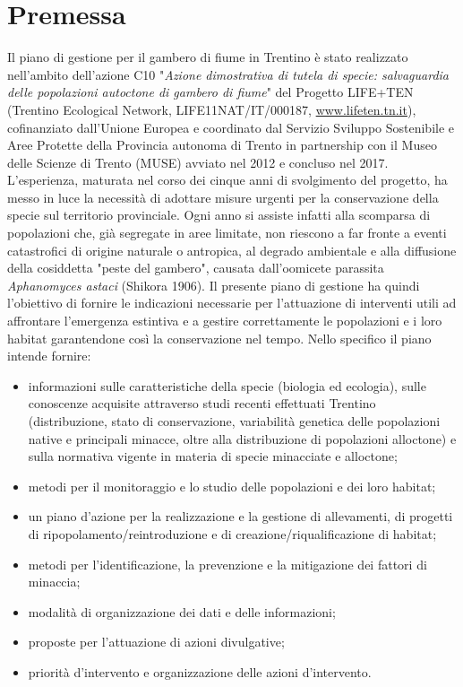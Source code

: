 \documentclass[11pt,a4paper,italian,twoside,openany]{memoir}
\begin{document}
\chapter{Premessa}
Il piano di gestione per il gambero di fiume in Trentino è stato realizzato nell'ambito dell'azione C10 "\emph{Azione dimostrativa di tutela di specie: salvaguardia delle popolazioni autoctone di gambero di fiume}" del Progetto LIFE+TEN (Trentino Ecological Network, LIFE11NAT/IT/000187, \url{www.lifeten.tn.it}), cofinanziato dall'Unione Europea e coordinato dal Servizio Sviluppo Sostenibile e Aree Protette della Provincia autonoma di Trento in partnership con il Museo delle Scienze di Trento (MUSE) avviato nel 2012 e concluso nel 2017. L'esperienza, maturata nel corso dei cinque anni di svolgimento del progetto, ha messo in luce la necessità di adottare misure urgenti per la conservazione della specie sul territorio provinciale. Ogni anno si assiste infatti alla scomparsa di popolazioni che, già segregate in aree limitate, non riescono a far fronte a eventi catastrofici di origine naturale o antropica, al degrado ambientale e alla diffusione della cosiddetta "peste del gambero", causata dall'oomicete parassita \emph{Aphanomyces astaci} (Shikora 1906). Il presente piano di gestione ha quindi l'obiettivo di fornire le indicazioni necessarie per l'attuazione di interventi utili ad affrontare l'emergenza estintiva e a gestire correttamente le popolazioni e i loro habitat garantendone così la conservazione nel tempo. 
Nello specifico il piano intende fornire:
\begin{itemize}

  \item informazioni sulle caratteristiche della specie (biologia ed ecologia), sulle conoscenze acquisite attraverso studi recenti effettuati Trentino (distribuzione, stato di conservazione, variabilità genetica delle popolazioni native e principali minacce, oltre alla distribuzione di popolazioni alloctone) e sulla normativa vigente in materia di specie minacciate e alloctone;
  \item metodi per il monitoraggio e lo studio delle popolazioni e dei loro habitat;
  \item un piano d'azione per la realizzazione e la gestione di allevamenti, di progetti di ripopolamento/reintroduzione e di creazione/riqualificazione di habitat;
  \item metodi per l'identificazione, la prevenzione e la mitigazione dei fattori di minaccia;
  \item modalità di organizzazione dei dati e delle informazioni;
  \item proposte per l'attuazione di azioni divulgative;
  \item priorità d'intervento e organizzazione delle azioni d'intervento.
\end{itemize}
\end{document}
